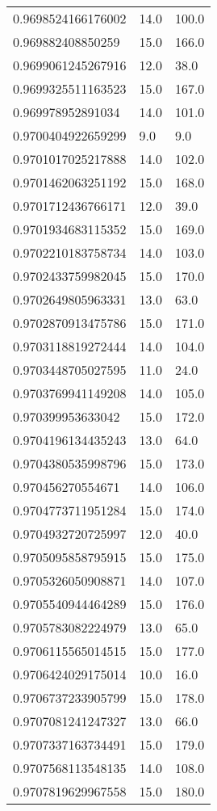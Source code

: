 \begin{center}
\begin{supertabular}[H]{p{0.30\textwidth}p{0.05\textwidth}p{0.05\textwidth}}
0.9698524166176002 & 14.0 & 100.0 \\ 
0.969882408850259 & 15.0 & 166.0 \\ 
0.9699061245267916 & 12.0 & 38.0 \\ 
0.9699325511163523 & 15.0 & 167.0 \\ 
0.969978952891034 & 14.0 & 101.0 \\ 
0.9700404922659299 & 9.0 & 9.0 \\ 
0.9701017025217888 & 14.0 & 102.0 \\ 
0.9701462063251192 & 15.0 & 168.0 \\ 
0.9701712436766171 & 12.0 & 39.0 \\ 
0.9701934683115352 & 15.0 & 169.0 \\ 
0.9702210183758734 & 14.0 & 103.0 \\ 
0.9702433759982045 & 15.0 & 170.0 \\ 
0.9702649805963331 & 13.0 & 63.0 \\ 
0.9702870913475786 & 15.0 & 171.0 \\ 
0.9703118819272444 & 14.0 & 104.0 \\ 
0.9703448705027595 & 11.0 & 24.0 \\ 
0.9703769941149208 & 14.0 & 105.0 \\ 
0.970399953633042 & 15.0 & 172.0 \\ 
0.9704196134435243 & 13.0 & 64.0 \\ 
0.9704380535998796 & 15.0 & 173.0 \\ 
0.970456270554671 & 14.0 & 106.0 \\ 
0.9704773711951284 & 15.0 & 174.0 \\ 
0.9704932720725997 & 12.0 & 40.0 \\ 
0.9705095858795915 & 15.0 & 175.0 \\ 
0.9705326050908871 & 14.0 & 107.0 \\ 
0.9705540944464289 & 15.0 & 176.0 \\ 
0.9705783082224979 & 13.0 & 65.0 \\ 
0.9706115565014515 & 15.0 & 177.0 \\ 
0.9706424029175014 & 10.0 & 16.0 \\ 
0.9706737233905799 & 15.0 & 178.0 \\ 
0.9707081241247327 & 13.0 & 66.0 \\ 
0.9707337163734491 & 15.0 & 179.0 \\ 
0.9707568113548135 & 14.0 & 108.0 \\ 
0.9707819629967558 & 15.0 & 180.0 \\ 

\end{supertabular}
\end{center}
